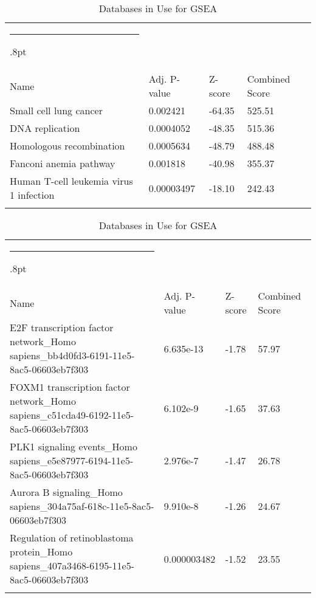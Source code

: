 \documentclass[3p,authoryear,preprint,12pt]{elsarticle}
\makeatletter
\def\hlinewd#1{%
  \noalign{\ifnum0=`}\fi\hrule \@height #1%
  \futurelet\reserved@a\@xhline}
\def\tbltoprule{\hlinewd{.8pt}\\[-12pt]}
\def\tblbottomrule{\noalign{\vspace*{6pt}}\hline\noalign{\vspace*{2pt}}}
\def\tblmidrule{\noalign{\vspace*{6pt}}\hline\noalign{\vspace*{2pt}}}
\makeatother
\begin{document}
\begin{table*}[!htbp]
	\caption{{Databases in Use for GSEA} }
	\label{tw-de478ae31cc6}
	\def\arraystretch{1}
	\ignorespaces 
	\centering 
	\begin{tabulary}{\linewidth}{p{\dimexpr.65\tabcolsep}p{\dimexpr.15\tabcolsep}p{\dimexpr.1\tabcolsep}p{\dimexpr.1\tabcolsep}}
		\tbltoprule Name & Adj. P-value & Z-score & Combined Score\\
		\tblmidrule
Small cell lung cancer & 0.002421 & -64.35 & 525.51 \\
DNA replication & 0.0004052 & -48.35 & 515.36 \\
Homologous recombination & 0.0005634 & -48.79 & 488.48 \\
Fanconi anemia pathway & 0.001818 & -40.98 & 355.37 \\
Human T-cell leukemia virus 1 infection & 0.00003497 & -18.10 & 242.43 \\
		\tblbottomrule
	\end{tabulary}\par 
\end{table*}
\begin{table*}[!htbp]
	\caption{{Databases in Use for GSEA} }
	\label{tw-de478ae31cc6}
	\def\arraystretch{1}
	\ignorespaces 
	\centering 
	\begin{tabulary}{\linewidth}{p{\dimexpr.65\tabcolsep}p{\dimexpr.15\tabcolsep}p{\dimexpr.1\tabcolsep}p{\dimexpr.1\tabcolsep}}
		\tbltoprule Name & Adj. P-value & Z-score & Combined Score\\
		\tblmidrule
E2F transcription factor network\_Homo sapiens\_bb4d0fd3-6191-11e5-8ac5-06603eb7f303 & 6.635e-13 & -1.78 & 57.97 \\
FOXM1 transcription factor network\_Homo sapiens\_c51cda49-6192-11e5-8ac5-06603eb7f303 & 6.102e-9 & -1.65 & 37.63 \\
PLK1 signaling events\_Homo sapiens\_e5e87977-6194-11e5-8ac5-06603eb7f303 & 2.976e-7 & -1.47 & 26.78 \\
Aurora B signaling\_Homo sapiens\_304a75af-618c-11e5-8ac5-06603eb7f303 & 9.910e-8 & -1.26 & 24.67 \\
Regulation of retinoblastoma protein\_Homo sapiens\_407a3468-6195-11e5-8ac5-06603eb7f303 & 0.000003482 & -1.52 & 23.55 \\
		\tblbottomrule
	\end{tabulary}\par 
\end{table*}
\end{document}

